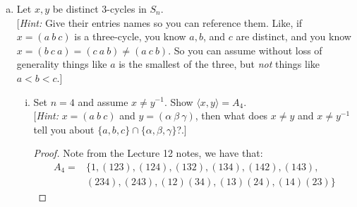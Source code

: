 \documentclass[11pt, reqno]{amsart}
\theoremstyle{plain}
\theoremstyle{definition}
\theoremstyle{example}
\def\<{\langle} \def\>{\rangle}
\begin{document}
\begin{enumerate}[1.]
\begin{enumerate}[(a)]
\begin{proof}
Now observe that $(i\ i+1)(i+1\ j)(i\ i+1) = (i\ j)$. So we get,
\begin{align*}
(i\ j) &= (i\ i+1)(i+1\ i+2)(i+2\ i+3) \cdots \\
&(j-2\ j-1)(j-1\ j)(j-2\ j-1)\cdots \\
&\cdots (i+2\ i+3)(i+1\ i+2)(i\ i+1)
\end{align*}

as required. In addition, note that $|j - i| = m+1$ since $|j - (i+1)| = m$. Hence, the statement being true for $|j - (i+1)| = m$ implies the statement is true for $|j - i| = m+1$. Thus, by induction this holds for any values $i, j$ with $|j - i| = m \geq 1$.

\end{proof}

\newpage
\item Let $x, y$ be distinct 3-cycles in $S_n$. \\
{[\emph{Hint:} Give their entries names so you can reference them. Like, if $x = (a\  b\  c)$ is a three-cycle, you know $a, b$, and $c$ are distinct, and you know $x = (b\  c\ a) = (c\ a\  b) \ne (a\  c\  b)$. So you can assume without loss of generality things like $a$ is the smallest of the three, but \emph{not} things like $a < b < c$.]}
\begin{enumerate}[(i)]
\item Set $n=4$ and assume $x \neq y^{-1}$. Show $\<x, y\> = A_4$.\\
{[\emph{Hint:} $x = (a\  b\ c)$ and $y = (\alpha\ \beta\  \gamma)$, then what does $x \ne y$ and $x \ne y^{-1}$ tell you about $\{a, b, c\} \cap \{\alpha, \beta, \gamma\}$?.]}

\begin{proof}
Note from the Lecture 12 notes, we have that:
\begin{align*}
A_4 = &\{1, (123), (124), (132), (134), (142), (143),\\
&(234), (243), (12)(34), (13)(24), (14)(23)\}
\end{align*}


\end{proof}
\end{enumerate}
\end{enumerate}
\end{enumerate}
\end{document}
